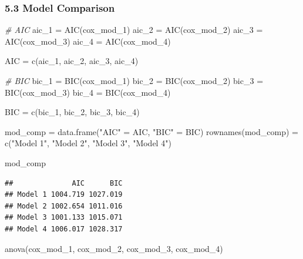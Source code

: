 \documentclass[
]{article}
\newenvironment{Shaded}{\begin{snugshade}}{\end{snugshade}}
\newcommand{\CommentTok}[1]{\textcolor[rgb]{0.56,0.35,0.01}{\textit{#1}}}
\newcommand{\FunctionTok}[1]{\textcolor[rgb]{0.00,0.00,0.00}{#1}}
\newcommand{\NormalTok}[1]{#1}
\newcommand{\OtherTok}[1]{\textcolor[rgb]{0.56,0.35,0.01}{#1}}
\newcommand{\StringTok}[1]{\textcolor[rgb]{0.31,0.60,0.02}{#1}}
\begin{document}
\hypertarget{model-comparison}{%
\subsubsection{5.3 Model Comparison}\label{model-comparison}}

\begin{Shaded}
\begin{Highlighting}[]
\CommentTok{\# AIC}
\NormalTok{aic\_1 }\OtherTok{=} \FunctionTok{AIC}\NormalTok{(cox\_mod\_1)}
\NormalTok{aic\_2 }\OtherTok{=} \FunctionTok{AIC}\NormalTok{(cox\_mod\_2)}
\NormalTok{aic\_3 }\OtherTok{=} \FunctionTok{AIC}\NormalTok{(cox\_mod\_3)}
\NormalTok{aic\_4 }\OtherTok{=} \FunctionTok{AIC}\NormalTok{(cox\_mod\_4)}

\NormalTok{AIC }\OtherTok{=} \FunctionTok{c}\NormalTok{(aic\_1, aic\_2, aic\_3, aic\_4)}

\CommentTok{\# BIC}
\NormalTok{bic\_1 }\OtherTok{=} \FunctionTok{BIC}\NormalTok{(cox\_mod\_1)}
\NormalTok{bic\_2 }\OtherTok{=} \FunctionTok{BIC}\NormalTok{(cox\_mod\_2)}
\NormalTok{bic\_3 }\OtherTok{=} \FunctionTok{BIC}\NormalTok{(cox\_mod\_3)}
\NormalTok{bic\_4 }\OtherTok{=} \FunctionTok{BIC}\NormalTok{(cox\_mod\_4)}

\NormalTok{BIC }\OtherTok{=} \FunctionTok{c}\NormalTok{(bic\_1, bic\_2, bic\_3, bic\_4)}

\NormalTok{mod\_comp }\OtherTok{=} \FunctionTok{data.frame}\NormalTok{(}\StringTok{"AIC"} \OtherTok{=}\NormalTok{ AIC,}
                      \StringTok{"BIC"} \OtherTok{=}\NormalTok{ BIC)}
\FunctionTok{rownames}\NormalTok{(mod\_comp) }\OtherTok{=} \FunctionTok{c}\NormalTok{(}\StringTok{"Model 1"}\NormalTok{, }\StringTok{"Model 2"}\NormalTok{, }\StringTok{"Model 3"}\NormalTok{, }\StringTok{"Model 4"}\NormalTok{)}

\NormalTok{mod\_comp}
\end{Highlighting}
\end{Shaded}

\begin{verbatim}
##              AIC      BIC
## Model 1 1004.719 1027.019
## Model 2 1002.654 1011.016
## Model 3 1001.133 1015.071
## Model 4 1006.017 1028.317
\end{verbatim}

\begin{Shaded}
\begin{Highlighting}[]
\FunctionTok{anova}\NormalTok{(cox\_mod\_1, cox\_mod\_2, cox\_mod\_3, cox\_mod\_4)}
\end{Highlighting}
\end{Shaded}
\end{document}
